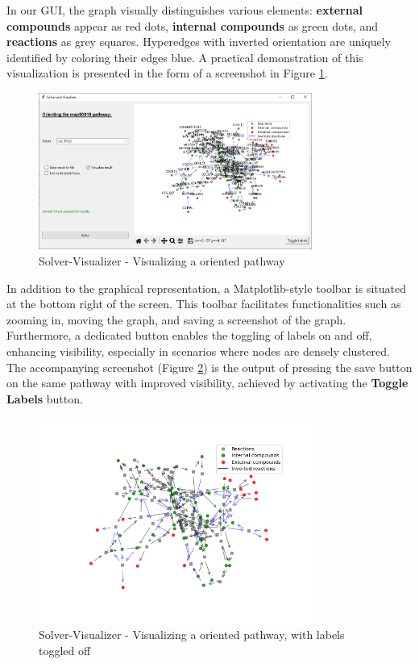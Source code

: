 \begin{framed}
\end{framed}


In our GUI, the graph visually distinguishes various elements: \textbf{external compounds} appear as red dots, \textbf{internal compounds} as green dots, and \textbf{reactions} as grey squares. Hyperedges with inverted orientation are uniquely identified by coloring their edges blue. A practical demonstration of this visualization is presented in the form of a screenshot in Figure \ref{fig:vis_labels}.

\begin{figure} [H]
    \centering
    \includegraphics[width=0.8\textwidth]{Design of the User Interface/vis_labels.png}
    \caption{Solver-Visualizer - Visualizing a oriented pathway}
    \label{fig:vis_labels}
\end{figure}

In addition to the graphical representation, a Matplotlib-style toolbar is situated at the bottom right of the screen. This toolbar facilitates functionalities such as zooming in, moving the graph, and saving a screenshot of the graph. Furthermore, a dedicated button enables the toggling of labels on and off, enhancing visibility, especially in scenarios where nodes are densely clustered. The accompanying screenshot (Figure \ref{fig:vis_no_labels}) is the output of pressing the save button on the same pathway with improved visibility, achieved by activating the \textbf{Toggle Labels} button.

\begin{figure}[H]
    \centering
    \includegraphics[width=0.8\textwidth]{Design of the User Interface/vis_no_labels.png}
    \caption{Solver-Visualizer - Visualizing a oriented pathway, with labels toggled off}
    \label{fig:vis_no_labels}
\end{figure}

